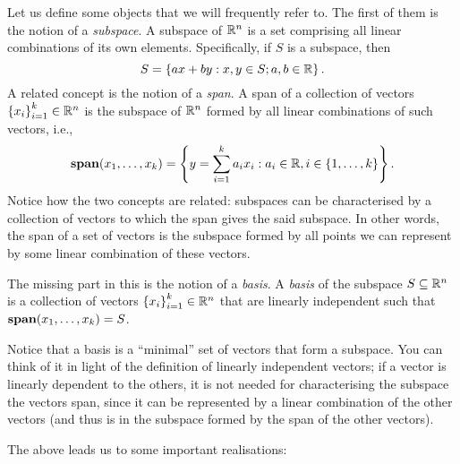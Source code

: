 Let us define some objects that we will frequently refer to. The first of them is the notion of a \emph{subspace}. A subspace of $\mathbb{R}^n$ is a set comprising all linear combinations of its own elements. Specifically, if $S$ is a subspace, then
%
\begin{equation*}
	S = \left\{ ax + by : x,y \in S; a,b \in \mathbb{R} \right \}.
\end{equation*}
%
A related concept is the notion of a \emph{span}. A span of a collection of vectors $\left\{ x_i \right \}_{i=1}^k \in \mathbb{R}^n$ is the subspace of $\mathbb{R}^n$ formed by all linear combinations of such vectors, i.e., 
%
\begin{equation*}
	\mathop{\bf span}(x_1,\dots, x_k) = \left\{ y = \sum_{i=1}^k a_ix_i : a_i \in \mathbb{R}, i \in \left\{ 1,\dots, k \right \} \right \}. 
\end{equation*}
%
Notice how the two concepts are related: subspaces can be characterised by a collection of vectors to which the span gives the said subspace. In other words, the span of a set of vectors is the subspace formed by all points we can represent by some linear combination of these vectors. 

The missing part in this is the notion of a \emph{basis}. A \emph{basis} of the subspace $S \subseteq \mathbb{R}^n$ is a collection of vectors $\left\{ x_i \right \}_{i=1}^k \in \mathbb{R}^n$ that are linearly independent such that $\mathop{\bf span}(x_1,\dots, x_k) = S$. 

Notice that a basis is a ``minimal'' set of vectors that form a subspace. You can think of it in light of the definition of linearly independent vectors; if a vector is linearly dependent to the others, it is not needed for characterising the subspace the vectors span, since it can be represented by a linear combination of the other vectors (and thus is in the subspace formed by the span of the other vectors).

The above leads us to some important realisations:

